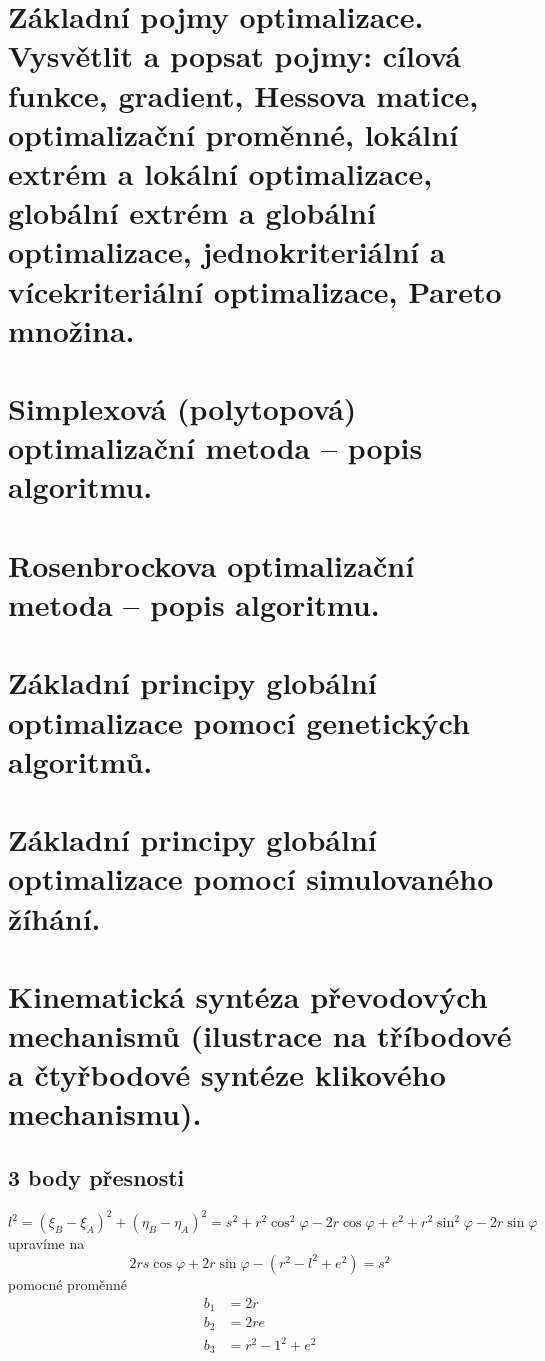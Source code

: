 \documentclass{article}
\begin{document}
	\section{Základní pojmy optimalizace. Vysvětlit a popsat pojmy: cílová funkce, gradient, Hessova matice, optimalizační proměnné, lokální extrém a lokální optimalizace, globální extrém a globální optimalizace, jednokriteriální a vícekriteriální optimalizace, Pareto množina.}

	\section{Simplexová (polytopová) optimalizační metoda – popis algoritmu.}

	\section{Rosenbrockova optimalizační metoda – popis algoritmu.}
	
	\section{Základní principy globální optimalizace pomocí genetických algoritmů.}

	\section{Základní principy globální optimalizace pomocí simulovaného žíhání.}
	\pagebreak

	\section{Kinematická syntéza převodových mechanismů (ilustrace na tříbodové a čtyřbodové syntéze klikového mechanismu).}

	\subsection*{3 body přesnosti}
	\begin{equation}
	l^{2}=\left(\xi_{B}-\xi_{A}\right)^{2}+\left(\eta_{B}-\eta_{A}\right)^{2}= s^{2}+r^{2} \cos ^{2} \varphi-2 r \cos \varphi+e^{2} + r^{2} \sin ^{2} \varphi-2 r \sin \varphi
	\end{equation}
	upravíme na
	\begin{equation}
		2 r s \cos \varphi+2 r \sin \varphi-\left(r^{2}-l^{2}+e^{2}\right)=s^{2}
	\end{equation}
	pomocné proměnné
	\begin{align}
		b_{1} &= 2 r \\
		b_{2} &= 2 r e \\
		b_{3} &= r^{2}-1^{2}+e^{2}
	\end{align}
\end{document}
